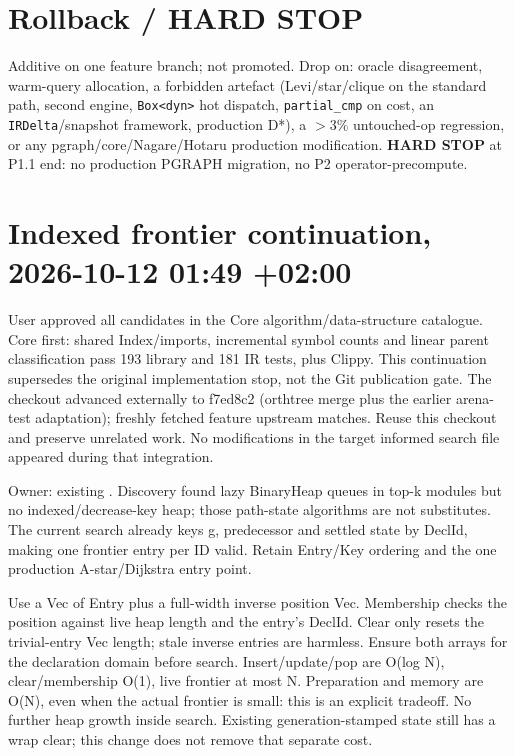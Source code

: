 \documentclass[11pt]{article}
\begin{document}
\section*{Rollback / HARD STOP}
Additive on one feature branch; not promoted. Drop on: oracle disagreement, warm-query allocation, a
forbidden artefact (Levi/star/clique on the standard path, second engine, \texttt{Box<dyn>} hot dispatch,
\texttt{partial\_cmp} on cost, an \texttt{IRDelta}/snapshot framework, production D*), a $>3\%$ untouched-op
regression, or any pgraph/core/Nagare/Hotaru production modification. \textbf{HARD STOP} at P1.1 end: no
production PGRAPH migration, no P2 operator-precompute.
\section*{Indexed frontier continuation, 2026-10-12 01:49 +02:00}
User approved all candidates in the Core algorithm/data-structure catalogue.
Core first: shared Index/imports, incremental symbol counts and linear parent
classification pass 193 library and 181 IR tests, plus Clippy. This continuation
supersedes the original implementation stop, not the Git publication gate.
The checkout advanced externally to f7ed8c2 (orthtree merge plus the earlier
arena-test adaptation); freshly fetched feature upstream matches. Reuse this
checkout and preserve unrelated work. No modifications in the target informed
search file appeared during that integration.

Owner: existing . Discovery found
lazy BinaryHeap queues in top-k modules but no indexed/decrease-key heap; those
path-state algorithms are not substitutes. The current search already keys g,
predecessor and settled state by DeclId, making one frontier entry per ID valid.
Retain Entry/Key ordering and the one production A-star/Dijkstra entry point.

Use a Vec of Entry plus a full-width inverse position Vec. Membership checks
the position against live heap length and the entry's DeclId. Clear only resets
the trivial-entry Vec length; stale inverse entries are harmless. Ensure both
arrays for the declaration domain before search. Insert/update/pop are O(log N),
clear/membership O(1), live frontier at most N. Preparation and memory are O(N),
even when the actual frontier is small: this is an explicit tradeoff. No further
heap growth inside search. Existing generation-stamped state still has a wrap
clear; this change does not remove that separate cost.
\end{document}

